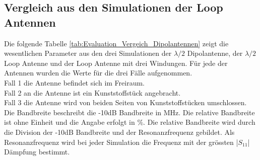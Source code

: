 



\newpage
\subsection{Vergleich aus den Simulationen der Loop Antennen}
Die folgende Tabelle \ref{tab:Evaluation_Vergeich_Dipolantennen} zeigt die wesentlichen Parameter aus den drei Simulationen der $\lambda/2$ Dipolantenne, der $\lambda/2$ Loop Antenne und der Loop Antenne mit drei Windungen. Für jede der Antennen wurden die Werte für die drei Fälle aufgenommen.\\
Fall 1 die Antenne befindet sich im Freiraum.\\
Fall 2 an die Antenne ist ein Kunststoffstück angebracht.\\
Fall 3 die Antenne wird von beiden Seiten von Kunststoffstücken umschlossen.\\
Die Bandbreite beschreibt die -10dB Bandbreite in MHz. Die relative Bandbreite ist ohne Einheit und die Angabe erfolgt in $\%$. Die relative Bandbreite wird durch die Division der -10dB Bandbreite und der Resonanzfrequenz gebildet. Als Resonanzfrequenz wird bei jeder Simulation die Frequenz mit der grössten |$S_{11}$| Dämpfung bestimmt.\\

